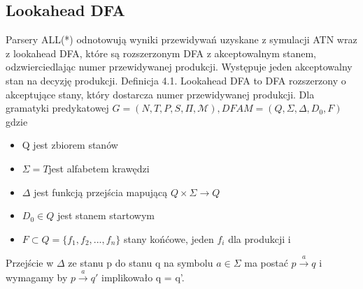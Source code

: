 \subsection{Lookahead DFA}
Parsery ALL(*) odnotowują wyniki przewidywań uzyskane z symulacji ATN wraz z lookahead DFA,
które są rozszerzonym DFA z akceptowalnym stanem, odzwierciedlając numer przewidywanej produkcji.
Występuje jeden akceptowalny stan na decyzję produkcji. 
Definicja 4.1. Lookahead DFA to DFA rozszerzony o akceptujące stany,
który dostarcza numer przewidywanej produkcji.
Dla gramatyki predykatowej \(G = (N, T, P, S, \Pi, \mathcal{M}), DFA M = (Q, \Sigma, \Delta, D_0, F) \) gdzie
\begin{itemize}
\item Q jest zbiorem stanów
\item \(\Sigma = T \)jest alfabetem krawędzi
\item \( \Delta \) jest funkcją przejścia mapującą \( Q \times \Sigma \rightarrow Q \)
\item \( D_0 \in Q \) jest stanem startowym
\item \( F \subset Q  = \{  f_1, f_2, ..., f_n\}\) stany końćowe, jeden \( f_i \)  dla produkcji i
\end{itemize}
Przejście w \( \Delta \) ze stanu p do stanu q na symbolu \( a \in \Sigma \)
ma postać \( p \overset{a}{\rightarrow} q \) i wymagamy by \(p \overset{a}{\rightarrow} q' \)
implikowało  q = q'.

